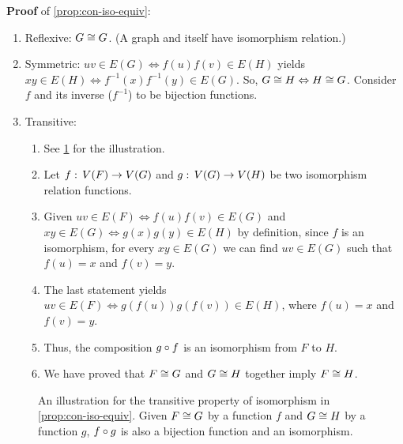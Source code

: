 \documentclass[../src/handouts/main.tex]{subfiles}
\begin{document}
\textbf{Proof} of \cref{prop:con-iso-equiv}:

\begin{enumerate}
  \item Reflexive: $G \cong G$. (A graph and itself have isomorphism relation.)
  \item Symmetric: $uv \in E(G) \iff f(u)f(v) \in E(H)$ yields $xy \in E(H) \iff f^{-1}(x)f^{-1}(y) \in E(G)$. So, $G \cong H \Leftrightarrow H \cong G$. Consider $f$ and its inverse ($f^{-1}$) to be bijection functions.
  \item Transitive:
        \begin{enumerate}
          \item See \cref{fig:con-iso-equiv} for the illustration.
          \item Let $f:\, V(F) \to V(G)$ and $g:\, V(G) \to V(H)$ be two isomorphism relation functions.
          \item Given $uv \in E(F) \iff f(u)f(v) \in E(G)$ and $xy \in E(G) \iff g(x)g(y) \in E(H)$ by definition, since $f$ is an isomorphism, for every $xy \in E(G)$ we can find $uv \in E(G)$ such that $f(u) = x$ and $f(v) = y$.
          \item The last statement yields $uv \in E(F) \iff g(f(u))g(f(v)) \in E(H)$, where $f(u) = x$ and $f(v) = y$.
          \item Thus, the composition $g \circ f$ is an isomorphism from $F$ to $H$.
          \item We have proved that $F \cong G$ and $G \cong H$ together imply $F \cong H$.
        \end{enumerate}
\end{enumerate}

\begin{figure}[htbp]
  \def\hoffset{3cm}%
  \def\voffset{1.2cm}%
  \def\domain#1#2{\draw[fill=#2] (\hoffset * #1, 0) ellipse (1cm and 2cm)}%
  \def\elements#1#2#3#4{
    \node[main] (#3) at (\hoffset * #1, \voffset) {$#3$}
    node[main] (#4) at (\hoffset * #1, 0) {$#4$}
    node at (\hoffset * #1, -\voffset) {$#2$};
    \draw[edge] (#3) -- (#4)
  }
  \centering
  \caption{An illustration for the transitive property of isomorphism in \cref{prop:con-iso-equiv}. Given $F \cong G$ by a function $f$ and $G \cong H$ by a function $g$, $f \circ g$ is also a bijection function and an isomorphism.}
  \label{fig:con-iso-equiv}
\end{figure}
\end{document}
